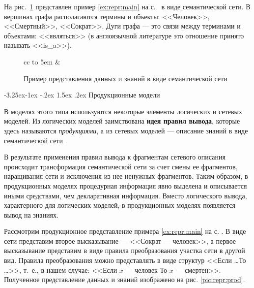 \documentclass[12pt, openany, twoside]{book} %
\makeatletter
\renewcommand\subsection{\@startsection{subsection}{2}{\z@}%
                                     {-3.25ex\@plus -1ex \@minus -.2ex}%
                                     {1.5ex \@plus .2ex}%
                                     {\normalfont\normalsize\bfseries}}
\makeatother
\begin{document}
На рис.~\ref{pic:repr:semnet} представлен пример \ref{ex:repr:main} на с.~\pageref{ex:repr:main} в виде семантической сети. В вершинах графа располагаются термины и объекты: <<Человек>>, <<Смертный>>, <<Сократ>>. Дуги графа --- это связи между терминами и объектами: <<являться>> (в англоязычной литературе это отношение принято называть <<is\_a>>).
\begin{figure}\small
\begin{center}%
  \begin{tabular}{cc}
	\hbox to 5em {} &
  \end{tabular}
%
%
\end{center}%
\caption{Пример представления данных и знаний в виде семантической сети}
\label{pic:repr:semnet}
\end{figure}

\subsection{Продукционные модели}

В моделях этого типа используются некоторые элементы логических и сетевых моделей. Из логических моделей заимствована {\bf идея правил вывода}, которые здесь называются {\em продукциями}, а из сетевых моделей --- описание знаний в виде семантической сети \cite{AIDictionary}.

В результате применения правил вывода к фрагментам сетевого описания происходит трансформация семантической сети за счет смены ее фрагментов, наращивания сети и исключения из нее ненужных фрагментов. Таким образом, в продукционных моделях процедурная информация явно выделена и описывается иными средствами, чем декларативная информация. Вместо логического вывода, характерного для логических моделей, в продукционных моделях появляется вывод на знаниях.

Рассмотрим продукционное представление примера \ref{ex:repr:main} на с. \pageref{ex:repr:main}. В виде сети представим второе высказывание --- <<Сократ --- человек>>, а первое высказывание представим в виде правила преобразования участка сети в другой вид. Правила преобразования можно представлять в виде структур <<Если \ldots То \ldots >>, т.~е., в нашем случае: <<Если $x$ --- человек То $x$ --- смертен>>. Полученное представление данных и знаний изображено на рис. \ref{pic:repr:prod}.
\end{document}
